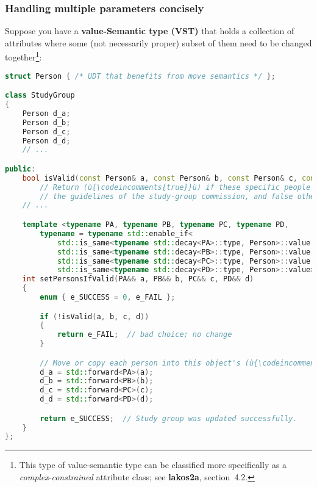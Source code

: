 \subsubsection[Handling multiple parameters concisely]{Handling multiple parameters concisely}\label{handling-multiple-parameters-concisely}

Suppose you have a \textbf{value-Semantic type (VST)} that holds a
collection of attributes where some (not necessarily proper) subset of
them need to be changed together{\cprotect\footnote{This type of
value-semantic type can be classified more specifically as a
\emph{complex}-\emph{constrained} attribute class; see \textbf{lakos2a}, section~4.2.}}:

\begin{lstlisting}[language=C++]
struct Person { /* UDT that benefits from move semantics */ };

class StudyGroup
{
    Person d_a;
    Person d_b;
    Person d_c;
    Person d_d;
    // ...

public:
    bool isValid(const Person& a, const Person& b, const Person& c, const Person& d);
        // Return (ù{\codeincomments{true}}ù) if these specific people form a valid study group under
        // the guidelines of the study-group commission, and false otherwise.
    // ...

    template <typename PA, typename PB, typename PC, typename PD,
        typename = typename std::enable_if<
            std::is_same<typename std::decay<PA>::type, Person>::value &&
            std::is_same<typename std::decay<PB>::type, Person>::value &&
            std::is_same<typename std::decay<PC>::type, Person>::value &&
            std::is_same<typename std::decay<PD>::type, Person>::value>::type>
    int setPersonsIfValid(PA&& a, PB&& b, PC&& c, PD&& d)
    {
        enum { e_SUCCESS = 0, e_FAIL };

        if (!isValid(a, b, c, d))
        {
            return e_FAIL;  // bad choice; no change
        }

        // Move or copy each person into this object's (ù{\codeincomments{Person}}ù) data members:
        d_a = std::forward<PA>(a);
        d_b = std::forward<PB>(b);
        d_c = std::forward<PC>(c);
        d_d = std::forward<PD>(d);

        return e_SUCCESS;  // Study group was updated successfully.
    }
};
\end{lstlisting}
    
